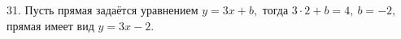 31. Пусть прямая задаётся уравнением $y=3x+b,$ тогда $3\cdot2+b=4,\ b=-2,$ прямая имеет вид $y=3x-2.$\\
